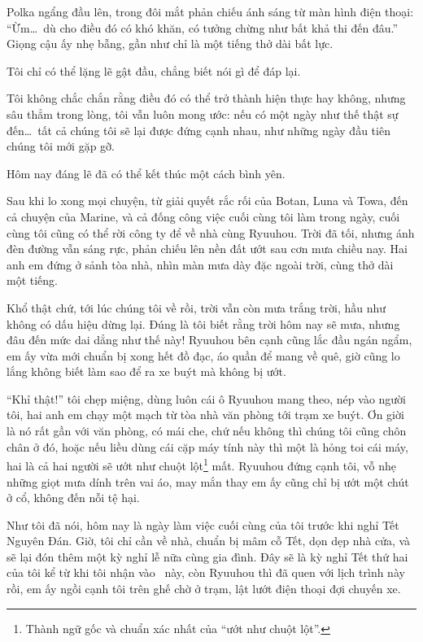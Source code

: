 \documentclass[../main.tex]{subfiles}
\begin{document}
Polka ngẩng đầu lên, trong đôi mắt phản chiếu ánh sáng từ màn hình điện thoại: ``Ừm\dots\ dù cho điều đó có khó khăn, có tưởng chừng như bất khả thi đến đâu.'' Giọng cậu ấy nhẹ bẫng, gần như chỉ là một tiếng thở dài bất lực.

Tôi chỉ có thể lặng lẽ gật đầu, chẳng biết nói gì để đáp lại.

Tôi không chắc chắn rằng điều đó có thể trở thành hiện thực hay không, nhưng sâu thẳm trong lòng, tôi vẫn luôn mong ước: nếu có một ngày như thế thật sự đến\dots\ tất cả chúng tôi sẽ lại được đứng cạnh nhau, như những ngày đầu tiên chúng tôi mới gặp gỡ.


Hôm nay đáng lẽ đã có thể kết thúc một cách bình yên.

Sau khi lo xong mọi chuyện, từ giải quyết rắc rối của Botan, Luna và Towa, đến cả chuyện của Marine, và cả đống công việc cuối cùng tôi làm trong ngày, cuối cùng tôi cũng có thể rời công ty để về nhà cùng Ryuuhou. Trời đã tối, nhưng ánh đèn đường vẫn sáng rực, phản chiếu lên nền đất ướt sau cơn mưa chiều nay. Hai anh em đứng ở sảnh tòa nhà, nhìn màn mưa dày đặc ngoài trời, cùng thở dài một tiếng.

Khổ thật chứ, tới lúc chúng tôi về rồi, trời vẫn còn mưa trắng trời, hầu như không có dấu hiệu dừng lại. Đúng là tôi biết rằng trời hôm nay sẽ mưa, nhưng đâu đến mức dai dẳng như thế này! Ryuuhou bên cạnh cũng lắc đầu ngán ngẩm, em ấy vừa mới chuẩn bị xong hết đồ đạc, áo quần để mang về quê, giờ cũng lo lắng không biết làm sao để ra xe buýt mà không bị ướt.

``Khỉ thật!'' tôi chẹp miệng, dùng luôn cái ô Ryuuhou mang theo, nép vào người tôi, hai anh em chạy một mạch từ tòa nhà văn phòng tới trạm xe buýt. Ơn giời là nó rất gần với văn phòng, có mái che, chứ nếu không thì chúng tôi cũng chôn chân ở đó, hoặc nếu liều dùng cái cặp máy tính này thì một là hỏng toi cái máy, hai là cả hai người sẽ ướt như chuột lột\footnote{Thành ngữ gốc và chuẩn xác nhất của ``ướt như chuột lột''.} mất. Ryuuhou đứng cạnh tôi, vỗ nhẹ những giọt mưa dính trên vai áo, may mắn thay em ấy cũng chỉ bị ướt một chút ở cổ, không đến nỗi tệ hại.

Như tôi đã nói, hôm nay là ngày làm việc cuối cùng của tôi trước khi nghỉ Tết Nguyên Đán. Giờ, tôi chỉ cần về nhà, chuẩn bị mâm cỗ Tết, dọn dẹp nhà cửa, và sẽ lại đón thêm một kỳ nghỉ lễ nữa cùng gia đình. Đây sẽ là kỳ nghỉ Tết thứ hai của tôi kể từ khi tôi nhận vào \hll\ này, còn Ryuuhou thì đã quen với lịch trình này rồi, em ấy ngồi cạnh tôi trên ghế chờ ở trạm, lật lướt điện thoại đợi chuyến xe.
\end{document}
